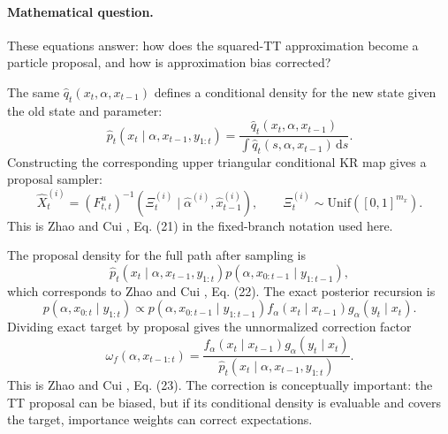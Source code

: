 \documentclass[11pt]{article}
\numberwithin{equation}{section}
\newcommand{\dd}{\,\mathrm d}
\begin{document}
\paragraph{Mathematical question.}
These equations answer: how does the squared-TT approximation become a
particle proposal, and how is approximation bias corrected?

The same \(\widehat q_t(x_t,\alpha,x_{t-1})\) defines a conditional density for
the new state given the old state and parameter:
\begin{equation}
    \widehat p_t(x_t\mid \alpha,x_{t-1},y_{1:t})
    =
    \frac{\widehat q_t(x_t,\alpha,x_{t-1})}
    {\int \widehat q_t(s,\alpha,x_{t-1})\dd s}.
    \label{eq:p24-f1}
\end{equation}
Constructing the corresponding upper triangular conditional KR map gives a
proposal sampler:
\begin{equation}
    \widehat X_t^{(i)}
    =
    (F_{t,t}^{u})^{-1}
    \left(\Xi_t^{(i)}\mid \widehat\alpha^{(i)},\widehat x_{t-1}^{(i)}\right),
    \qquad
    \Xi_t^{(i)}\sim\mathrm{Unif}([0,1]^{m_x}).
    \label{eq:p24-f2}
\end{equation}
This is Zhao and Cui \cite{zhao2024ttsequential}, Eq. (21) in the fixed-branch notation used here.

The proposal density for the full path after sampling is
\begin{equation}
    \widehat p_t(x_t\mid \alpha,x_{t-1},y_{1:t})
    p(\alpha,x_{0:t-1}\mid y_{1:t-1}),
    \label{eq:p24-f3}
\end{equation}
which corresponds to Zhao and Cui \cite{zhao2024ttsequential}, Eq. (22).  The exact posterior recursion is
\[
    p(\alpha,x_{0:t}\mid y_{1:t})
    \propto
    p(\alpha,x_{0:t-1}\mid y_{1:t-1})
    f_\alpha(x_t\mid x_{t-1})
    g_\alpha(y_t\mid x_t).
\]
Dividing exact target by proposal gives the unnormalized correction factor
\begin{equation}
    \omega_f(\alpha,x_{t-1:t})
    =
    \frac{
    f_\alpha(x_t\mid x_{t-1})g_\alpha(y_t\mid x_t)}
    {\widehat p_t(x_t\mid \alpha,x_{t-1},y_{1:t})}.
    \label{eq:p24-f4}
\end{equation}
This is Zhao and Cui \cite{zhao2024ttsequential}, Eq. (23).  The correction is conceptually important: the TT
proposal can be biased, but if its conditional density is evaluable and covers
the target, importance weights can correct expectations.
\end{document}
